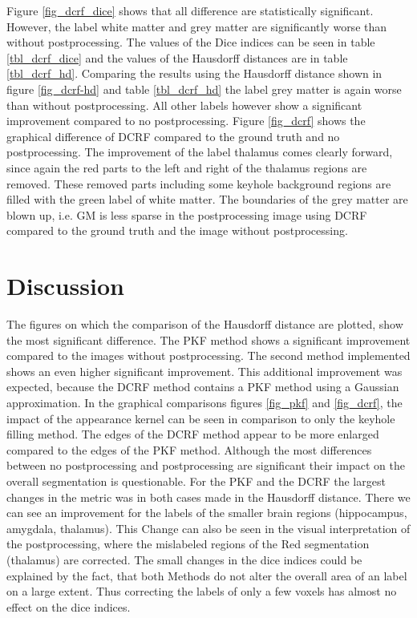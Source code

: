\documentclass[journal]{IEEEtran}
\begin{document}
Figure \ref{fig_dcrf_dice} shows that all difference are statistically significant. However, the label white matter and grey matter are significantly worse than without postprocessing.
The values of the Dice indices can be seen in table \ref{tbl_dcrf_dice} and the values of the Hausdorff distances are in table \ref{tbl_dcrf_hd}.
Comparing the results using the Hausdorff distance shown in figure \ref{fig_dcrf-hd} and table \ref{tbl_dcrf_hd} the label grey matter is again worse than without postprocessing. All other labels however show a significant improvement compared to no postprocessing. 
Figure \ref{fig_dcrf} shows the graphical difference of DCRF compared to the ground truth and no postprocessing. The improvement of the label thalamus comes clearly forward, since again the red parts to the left and right of the thalamus regions are removed. These removed parts including some keyhole background regions are filled with the green label of white matter. 
The boundaries of the grey matter are blown up, i.e. GM is less sparse in the postprocessing image using DCRF compared to the ground truth and the image without postprocessing.

\section{Discussion}
The figures on which the comparison of the Hausdorff distance are plotted, show the most significant difference. The PKF method shows a significant improvement compared to the images without postprocessing. The second method implemented shows an even higher significant improvement. This additional improvement was expected, because the DCRF method contains a PKF method using a Gaussian approximation. In the graphical comparisons figures \ref{fig_pkf} and \ref{fig_dcrf}, the impact of the appearance kernel can be seen in comparison to only the keyhole filling method. The edges of the DCRF method appear to be more enlarged compared to the edges of the PKF method.
Although the most differences between no postprocessing and postprocessing are significant their impact on the overall segmentation is questionable. For the PKF and the DCRF the largest changes in the metric was in both cases made in the Hausdorff distance. There we can see an improvement for the labels of the smaller brain regions (hippocampus, amygdala, thalamus). This Change can also be seen in the visual interpretation of the postprocessing, where the mislabeled regions of the Red segmentation (thalamus) are corrected. The small changes in the dice indices could be explained by the fact, that both Methods do not alter the overall area of an label on a large extent. Thus correcting the labels of only a few voxels has almost no effect on the dice indices.
\end{document}
